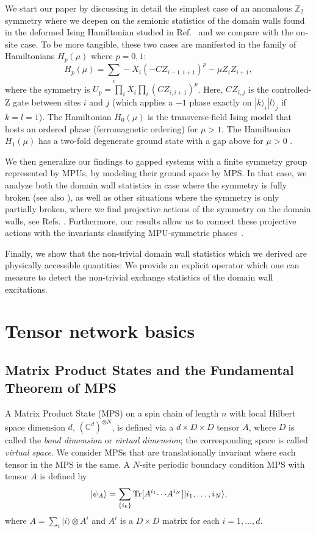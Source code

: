 \documentclass[aps,pra,export,nofootinbib]{revtex4-2}
\newcommand{\tr}{{\rm Tr}}
\begin{document}
We start our paper by discussing in detail the simplest case of an anomalous $\mathbb{Z}_2$ symmetry where we deepen on the semionic statistics of the domain walls found in the deformed Ising Hamiltonian studied in Ref.~\cite{Roose19} and we compare with the on-site case. To be more tangible, these two cases are manifested in the family of Hamiltonians $H_p(\mu)$ where $p=0,1$:
\begin{equation}\label{eq:Hmotiv}
 H_p(\mu) = \sum_i -X_i (-CZ_{i-1,i+1})^p - \mu Z_i Z_{i+1}, 
\end{equation}
where the symmetry is $U_p = \prod_i X_i  \prod_i (CZ _{i,i+1})^p$.
Here, $CZ_{i,j}$ is the controlled-Z gate between sites $i$ and $j$ (which applies a $-1$ phase exactly on $|k\rangle_i |l\rangle_j$ if $k=l=1$). The Hamiltonian $H_0(\mu)$ is the transverse-field Ising model that hosts an ordered phase (ferromagnetic ordering) for $\mu >1$. The Hamiltonian $H_1(\mu)$ has a two-fold degenerate ground state with a gap above for $\mu >0$ \cite{Roose19}.


We then generalize our findings to gapped systems with a finite symmetry group represented by MPUs, by modeling their ground space by MPS.
In that case, we analyze both the domain wall statistics in case where the symmetry is fully broken (see also \cite{Kawagoe21}), as well as other situations where the symmetry is only partially broken, where we find projective
actions of the symmetry on the domain walls, see Refs. \cite{Lan14, Lu14,Zaletel14,Wang15A}. 
Furthermore, our results allow us to 
connect these projective actions with the invariants classifying MPU-symmetric
phases~\cite{Garre22,Garre24}. 

Finally, we show that the non-trivial domain wall statistics which we derived 
are physically accessible quantities: We provide an explicit operator which one can measure to detect the non-trivial exchange statistics of the domain wall excitations.



\section{Tensor network basics}

\subsection{Matrix Product States and the Fundamental Theorem of MPS}

A Matrix Product State (MPS) on a spin chain of length $n$ with local Hilbert space dimension $d$, $(\mathbb C^d)^{\otimes N}$, 
is defined via a $d\times D\times D$ tensor $A$, where $D$ is called the \emph{bond dimension} or \emph{virtual dimension}; the corresponding space is called \emph{virtual space}.
We consider MPSs that are translationally invariant where each tensor in the MPS is the same. A $N$-site periodic boundary condition MPS with tensor $A$ is defined by
$$|\psi_A\rangle = \sum_{\{i_k\}} \tr[A^{i_1}{\cdots} A^{i_N}]|{i_1}, \dots, {i_N}\rangle,$$
where $A=\sum_i |i\rangle \otimes A^i$ and $A^i$ is a $D\times D$ matrix for each $i=1,\dots,d$. 
\end{document}
